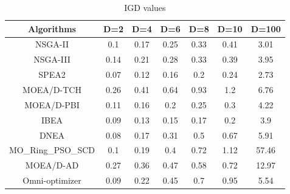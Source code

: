 \documentclass[conference]{IEEEtran}
\begin{document}
\begin{table}[htbp]
\centering
\caption{IGD values}
\begin{tabular}{@{}ccccccc@{}}
\toprule
Algorithms      & D=2                          & D=4                          & D=6                          & D=8                          & D=10                        & D=100                        \\ \midrule
NSGA-II         & 0.1                          & 0.17                         & 0.25                         & 0.33                         & 0.41                        & 3.01                         \\
NSGA-III        & 0.14                         & 0.21                         & 0.28                         & 0.33                         & 0.39                        & 3.95                         \\
SPEA2           & \cellcolor[HTML]{F8FF00}0.07 & \cellcolor[HTML]{F8FF00}0.12 & 0.16                         & 0.2                          & 0.24                        & \cellcolor[HTML]{F8FF00}2.73 \\
MOEA/D-TCH      & 0.26                         & 0.41                         & 0.64                         & 0.93                         & 1.2                         & 6.76                         \\
MOEA/D-PBI      & 0.11                         & 0.16                         & 0.2                          & 0.25                         & 0.3                         & 4.22                          \\
IBEA            & 0.09                         & 0.13                         & \cellcolor[HTML]{F8FF00}0.15 & \cellcolor[HTML]{F8FF00}0.17 & \cellcolor[HTML]{F8FF00}0.2 & 3.9                          \\
DNEA            & 0.08                         & 0.17                         & 0.31                         & 0.5                          & 0.67                        & 5.91                         \\
MO\_Ring\_PSO\_SCD & 0.1                          & 0.19                         & 0.4                          & 0.72                         & 1.12                        & 57.46                        \\
MOEA/D-AD       & 0.27                         & 0.36                         & 0.47                         & 0.58                         & 0.72                        & 12.97                        \\
Omni-optimizer  & 0.09                         & 0.22                          & 0.45                         & 0.7                          & 0.95                        & 5.54                         \\ \bottomrule
\end{tabular}
\label{table: IGD sumup}
\end{table}
\end{document}
